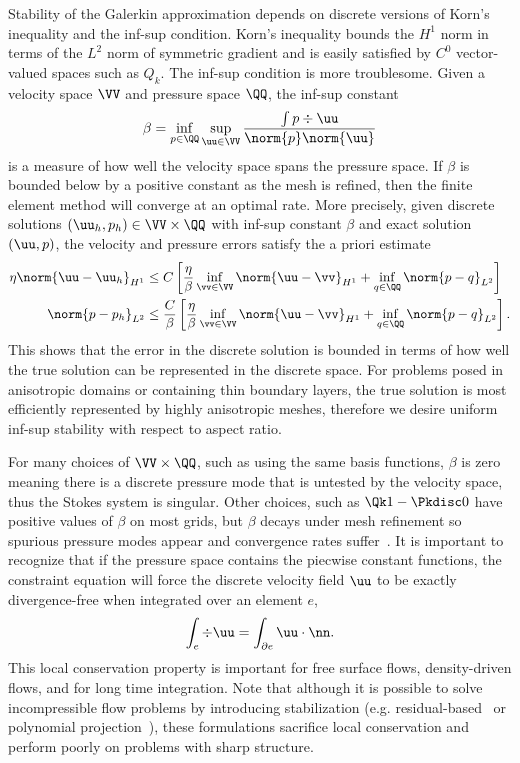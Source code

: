 Stability of the Galerkin approximation depends on discrete versions of Korn's inequality and the inf-sup condition.
Korn's inequality bounds the $H^1$ norm in terms of the $L^2$ norm of symmetric gradient and is easily satisfied by $C^0$ vector-valued spaces such as $Q_k$.
The inf-sup condition is more troublesome.
Given a velocity space $\VV$ and pressure space $\QQ$, the inf-sup constant
\begin{equation}\label{eq:slip:inf-sup}
  \beta = \inf_{p\in \QQ} \sup_{\uu\in\VV} \frac{\int p\div\uu}{\norm{p} \norm{\uu}}
\end{equation}
is a measure of how well the velocity space spans the pressure space.
If $\beta$ is bounded below by a positive constant as the mesh is refined, then the finite element method will converge at an optimal rate.
More precisely, given discrete solutions $(\uu_h,p_h) \in \VV \times \QQ$ with inf-sup constant $\beta$ and exact solution $(\uu,p)$, the velocity and pressure errors satisfy the a priori estimate~\citep{brezzi1991mixed}
\begin{align}\label{eq:slip:apriori}
  \eta \norm{\uu - \uu_h}_{H^1} & \le C \left[ \frac{\eta}{\beta} \inf_{\vv \in \VV} \norm{\uu - \vv}_{H^1} + \inf_{q \in \QQ} \norm{p-q}_{L^2} \right] \\
  \norm{p - p_h}_{L^2} & \le \frac{C}{\beta} \left[ \frac{\eta}{\beta} \inf_{\vv \in \VV} \norm{\uu - \vv}_{H^1} + \inf_{q\in\QQ} \norm{p-q}_{L^2} \right] .
\end{align}
This shows that the error in the discrete solution is bounded in terms of how well the true solution can be represented in the discrete space.
For problems posed in anisotropic domains or containing thin boundary layers, the true solution is most efficiently represented by highly anisotropic meshes, therefore we desire uniform inf-sup stability with respect to aspect ratio.

For many choices of $\VV \times \QQ$, such as using the same basis functions, $\beta$ is zero meaning there is a discrete pressure mode that is untested by the velocity space, thus the Stokes system is singular.
Other choices, such as $\Qk 1-\Pkdisc 0$ have positive values of $\beta$ on most grids, but $\beta$ decays under mesh refinement so spurious pressure modes appear and convergence rates suffer~\citep{brenner2008mathematical,chapelle1993inf,babuska1997babuska}.
It is important to recognize that if the pressure space contains the piecwise constant functions, the constraint equation will force the discrete velocity field $\uu$ to be exactly divergence-free when integrated over an element $e$,
\begin{gather*}
  \int_e \div\uu = \int_{\partial e} \uu\cdot\nn.
\end{gather*}
This local conservation property is important for free surface flows, density-driven flows, and for long time integration.
Note that although it is possible to solve incompressible flow problems by introducing stabilization (e.g. residual-based~\citep{hughes1986new} or polynomial projection~\citep{dohrmann2004stabilized}), these formulations sacrifice local conservation and perform poorly on problems with sharp structure.

